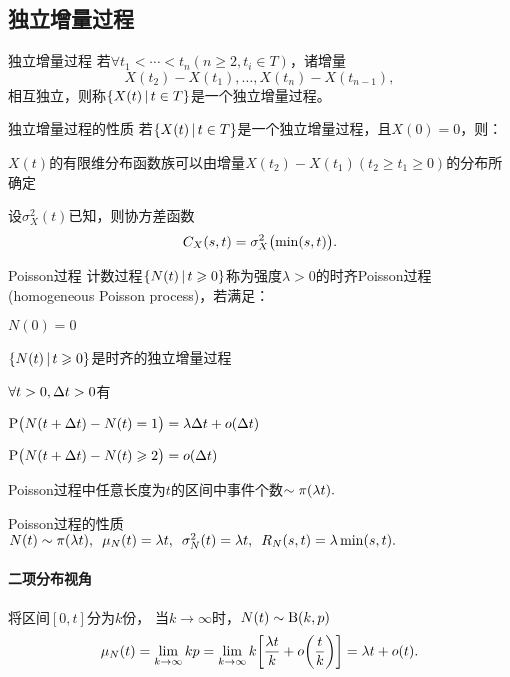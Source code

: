 \subsection{独立增量过程}
\begin{definition}{独立增量过程}{}
	若$\forall t_1<\cdots<t_n(n\geqslant2, t_i\in T)$，诸增量
	\[
		X(t_2)-X(t_1),\ldots,X(t_n)-X(t_{n-1}),
	\]
	相互独立，则称$\left\{X(t)\,\middle\vert\,t\in T\right\}$是一个独立增量过程。
\end{definition}
\begin{theorem}{独立增量过程的性质}{}
	若$\left\{X(t)\,\middle\vert\,t\in T\right\}$是一个独立增量过程，且$X(0)=0$，则：
	\begin{compactitem}
		\item $X(t)$的有限维分布函数族可以由增量$X(t_2)-X(t_1)(t_2\geqslant t_1\geqslant 0)$的分布所确定
		\item 设$\sigma^2_X(t)$已知，则协方差函数
		\begin{align}
			C_X(s,t)=\sigma^2_X\bigl(\min(s,t)\bigr).
		\end{align}
	\end{compactitem}
\end{theorem}
\begin{definition}{Poisson过程}{}
	计数过程$\left\{N(t)\,\middle\vert\,t\geqslant 0\right\}$称为强度$\lambda>0$的时齐Poisson过程(homogeneous Poisson process)，若满足：
	\begin{compactenum}
		\item $N(0)=0$
		\item $\left\{N(t)\,\middle\vert\,t\geqslant 0\right\}$是时齐的独立增量过程
		\item $\forall t>0,\Delta t>0$有
		\begin{compactitem}
			\item $\operatorname{P}\bigl(N(t+\Delta t)-N(t)=1\bigr)=\lambda\Delta t+o(\Delta t)$
			\item $\operatorname{P}\bigl(N(t+\Delta t)-N(t)\geqslant 2\bigr)=o(\Delta t)$
		\end{compactitem}
	\end{compactenum}
\end{definition}
Poisson过程中任意长度为$ t $的区间中事件个数$\sim\operatorname{\pi}(\lambda t).$
\begin{theorem}{Poisson过程的性质}{}
	$N(t)\sim\operatorname{\pi}(\lambda t),\enspace\mu_N(t)=\lambda t,\enspace\sigma^2_N(t)=\lambda t,\enspace R_N(s,t)=\lambda\min(s,t).$%
\end{theorem}
\paragraph{二项分布视角}
将区间$ [0, t] $分为$ k $份，
当$k\to\infty$时，$N(t)\sim\operatorname{B}(k,p)$
\[
	\mu_N(t)=\lim_{k\to\infty}kp=\lim_{k\to\infty}k\biggl[\frac{\lambda t}k+o\biggl(\frac tk\biggr)\biggr]=\lambda t+o(t).
\]
